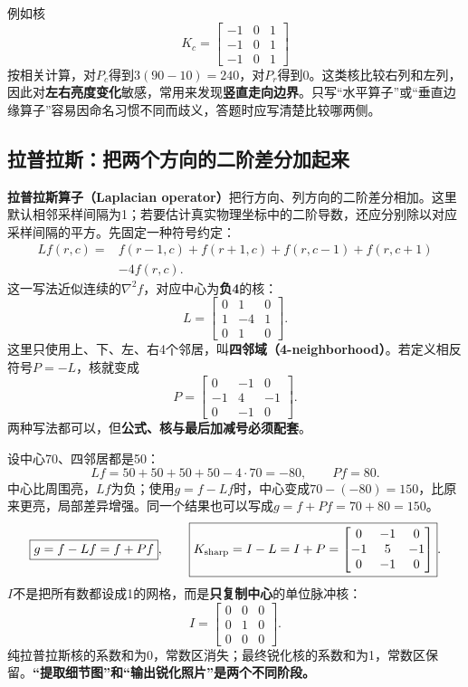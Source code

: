 例如核
\[
 K_c=\begin{bmatrix}-1&0&1\\-1&0&1\\-1&0&1\end{bmatrix}
\]
按相关计算，对$P_c$得到$3(90-10)=240$，对$P_r$得到0。这类核比较右列和左列，因此对\textbf{左右亮度变化}敏感，常用来发现\textbf{竖直走向边界}。只写“水平算子”或“垂直边缘算子”容易因命名习惯不同而歧义，答题时应写清楚比较哪两侧。

\subsection{拉普拉斯：把两个方向的二阶差分加起来}
\textbf{拉普拉斯算子（Laplacian operator）}把行方向、列方向的二阶差分相加。这里默认相邻采样间隔为1；若要估计真实物理坐标中的二阶导数，还应分别除以对应采样间隔的平方。先固定一种符号约定：
\begin{align*}
 Lf(r,c)={}&f(r-1,c)+f(r+1,c)+f(r,c-1)+f(r,c+1)\\
          &-4f(r,c).
\end{align*}
这一写法近似连续的$\nabla^2 f$，对应中心为\textbf{负4}的核：
\[
 L=\begin{bmatrix}0&1&0\\1&-4&1\\0&1&0\end{bmatrix}.
\]
这里只使用上、下、左、右4个邻居，叫\textbf{四邻域（4-neighborhood）}。若定义相反符号$P=-L$，核就变成
\[
 P=\begin{bmatrix}0&-1&0\\-1&4&-1\\0&-1&0\end{bmatrix}.
\]
两种写法都可以，但\textbf{公式、核与最后加减号必须配套}。

设中心70、四邻居都是50：
\[
 Lf=50+50+50+50-4\cdot70=-80,\qquad Pf=80.
\]
中心比周围亮，$Lf$为负；使用$g=f-Lf$时，中心变成$70-(-80)=150$，比原来更亮，局部差异增强。同一个结果也可以写成$g=f+Pf=70+80=150$。
\[
 \boxed{g=f-Lf=f+Pf},\qquad
 \boxed{K_{\rm sharp}=I-L=I+P=
 \begin{bmatrix}0&-1&0\\-1&5&-1\\0&-1&0\end{bmatrix}}.
\]
$I$不是把所有数都设成1的网格，而是\textbf{只复制中心}的单位脉冲核：
\[
 I=\begin{bmatrix}0&0&0\\0&1&0\\0&0&0\end{bmatrix}.
\]
纯拉普拉斯核的系数和为0，常数区消失；最终锐化核的系数和为1，常数区保留。\textbf{“提取细节图”和“输出锐化照片”是两个不同阶段。}

